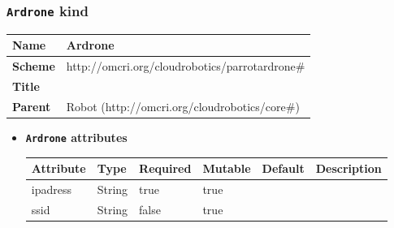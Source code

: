 \subsubsection{\texttt{Ardrone} kind}
\begin{center}
\begin{tabular}{|l|l|}
  \hline
  \textbf{Name} & Ardrone \\
  \hline  
  \textbf{Scheme} & http://omcri.org/cloudrobotics/parrotardrone\# \\
  \hline
  \textbf{Title} &  \\
  \hline
  \textbf{Parent} & Robot (http://omcri.org/cloudrobotics/core\#) \\
  \hline
\end{tabular}
\end{center}
\begin{itemize}
\item \textbf{\texttt{Ardrone} attributes}

\begin{tabularx}{\textwidth}{|l|l|p{1.4cm}|p{1.3cm}|l|X|}
  \hline
  \textbf{Attribute} & \textbf{Type} & \textbf{Required} & \textbf{Mutable} & \textbf{Default} & \textbf{Description} \\
  \hline  
  ipadress & String & true & true &  &  \\
  \hline
  ssid & String & false & true &  &  \\
  \hline
\end{tabularx}
\end{itemize}



